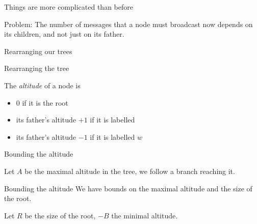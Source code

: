 \documentclass{beamer}
\begin{document}
\begin{frame}{Things are more complicated than before}
	\begin{center}
	
	\end{center}

	Problem: The number of messages that a node must broadcast now depends on its  children, and not just on its father.
\end{frame}

\begin{frame}{Rearranging our trees}
	\centering
	
\end{frame}

\begin{frame}{Rearranging the tree}
	\begin{definition}
		The \emph{altitude} of a node is 
		
		\begin{itemize}
			\item 0 if it is the root
			
			\item its father's altitude $+1$ if it is labelled 
		
			\item its father's altitude $-1$ if it is labelled $w$
		\end{itemize}
	\end{definition}
\end{frame}

\begin{frame}{Bounding the altitude}
	
	Let $A$ be the maximal altitude in the tree, we follow a branch reaching it. 
	
	
	
\end{frame}

\begin{frame}{Bounding the altitude}
	We have bounds on the maximal altitude and the size of the root.
	
	Let $R$ be the size of the root, $-B$ the minimal altitude.
	
	
\end{frame}

	
			
\end{document}
